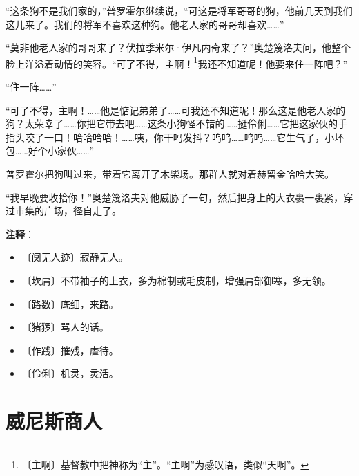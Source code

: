 \documentclass[12pt,UTF-8,openany]{ctexbook}
\begin{document}
\begin{normalsize}
    “这条狗不是我们家的，”普罗霍尔继续说，“可这是将军哥哥的狗，他前几天到我们这儿来了。我们的将军不喜欢这种狗。他老人家的哥哥却喜欢……”
    
    “莫非他老人家的哥哥来了？伏拉季米尔·伊凡内奇来了？”奥楚篾洛夫问，他整个脸上洋溢着动情的笑容。“可了不得，主啊！\footnote{〔主啊〕基督教中把神称为“主”。“主啊”为感叹语，类似“天啊”。}我还不知道呢！他要来住一阵吧？”
    
    “住一阵……”
    
    “可了不得，主啊！……他是惦记弟弟了……可我还不知道呢！那么这是他老人家的狗？太荣幸了……你把它带去吧……这条小狗怪不错的……挺伶俐……它把这家伙的手指头咬了一口！哈哈哈哈！……咦，你干吗发抖？呜呜……呜呜……它生气了，小坏包……好个小家伙……”
    
    普罗霍尔把狗叫过来，带着它离开了木柴场。那群人就对着赫留金哈哈大笑。
    
    “我早晚要收拾你！”奥楚篾洛夫对他威胁了一句，然后把身上的大衣裹一裹紧，穿过市集的广场，径自走了。
    
\end{normalsize}


\newpage

\textbf{注释}：

\vspace{-1em}

\begin{itemize}
    \setlength\itemsep{-0.2em}
    \item 〔阒无人迹〕寂静无人。
    \item 〔坎肩〕不带袖子的上衣，多为棉制或毛皮制，增强肩部御寒，多无领。
    \item 〔路数〕底细，来路。
    \item 〔猪猡〕骂人的话。
    \item 〔作践〕摧残，虐待。
    \item 〔伶俐〕机灵，灵活。
\end{itemize}

\chapter{威尼斯商人}
\end{document}
